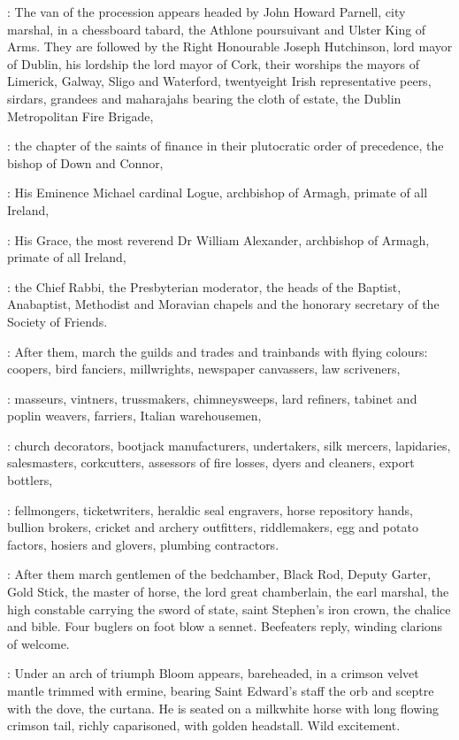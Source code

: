 :
The van of the procession appears headed by John Howard Parnell,
city marshal,
in a chessboard tabard,
the Athlone poursuivant and Ulster King of Arms.
They are followed by the Right Honourable Joseph Hutchinson,
lord mayor of Dublin,
his lordship the lord mayor of Cork,
their worships the mayors of Limerick,
Galway,
Sligo and Waterford,
twentyeight Irish representative peers,
sirdars,
grandees and maharajahs
bearing the cloth of estate,
the Dublin Metropolitan Fire Brigade,

:
the chapter of the saints of finance in their plutocratic order of precedence,
the bishop of Down and Connor,

:
His Eminence Michael cardinal Logue,
archbishop of Armagh,
primate of all Ireland,

:
His Grace,
the most reverend Dr William Alexander,
archbishop of Armagh,
primate of all Ireland,

:
the Chief Rabbi,
the Presbyterian moderator,
the heads of the Baptist,
Anabaptist,
Methodist and Moravian chapels
and the honorary secretary of the Society of Friends.

:
After them,
march the guilds and trades and trainbands with flying colours:
coopers,
bird fanciers,
millwrights,
newspaper canvassers,
law scriveners,

:
masseurs,
vintners,
trussmakers,
chimneysweeps,
lard refiners,
tabinet and poplin weavers,
farriers,
Italian warehousemen,

:
church decorators,
bootjack manufacturers,
undertakers,
silk mercers,
lapidaries,
salesmasters,
corkcutters,
assessors of fire losses,
dyers and cleaners,
export bottlers,

:
fellmongers,
ticketwriters,
heraldic seal engravers,
horse repository hands,
bullion brokers,
cricket and archery outfitters,
riddlemakers,
egg and potato factors,
hosiers and glovers,
plumbing contractors.

:
After them march gentlemen of the bedchamber,
Black Rod,
Deputy Garter,
Gold Stick,
the master of horse,
the lord great chamberlain,
the earl marshal,
the high constable carrying the sword of state,
saint Stephen's iron crown,
the chalice and bible.
Four buglers on foot blow a sennet.
Beefeaters reply,
winding clarions of welcome.

:
Under an arch of triumph Bloom appears,
bareheaded,
in a crimson velvet mantle trimmed with ermine,
bearing Saint Edward's staff the orb and sceptre with the dove,
the curtana.
He is seated on a milkwhite horse with long flowing crimson tail,
richly caparisoned,
with golden headstall.
Wild excitement.

